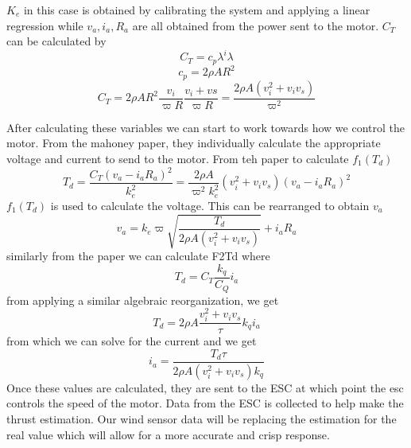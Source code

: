 \documentclass{article}
\begin{document}
$K_{e}$ in this case is obtained by calibrating the system and applying a linear regression while $v_{a}, i_{a}, R_{a}$ are all obtained from the power sent to the motor. $C_{T}$ can be calculated by 
\begin{equation}
C_{T} = c_{p} \lambda ^i \lambda 
\end{equation}
\begin{equation}
c_{p} = 2 \rho A R^2 \nonumber
\end{equation}
\begin{equation}
C_{T} = 2 \rho A R^2 \frac{v_{i}}{\varpi R}\frac{v_{i} + v{s}}{\varpi R}  = \frac{2 \rho A (v_{i}^2 + v_{i}v_{s})}{\varpi ^2}
\end{equation}

After calculating these variables we can start to work towards how we control the motor. From the mahoney paper, they individually calculate the appropriate voltage and current to send to the motor. From teh paper to calculate $f_{1}(T_{d})$
\begin{equation}
T_{d} = \frac{C_{T}(v_{a} - i_{a}R_{a})^2}{k_{e}^2}
 = \frac{2 \rho A}{\varpi ^2 k^2_{e}}(v^2_{i} + v_{i}v_{s})(v_{a} - i_{a}R_{a})^2
\end{equation}
$f_{1}(T_{d})$ is used to calculate the voltage. This can be rearranged to obtain $v_{a}$
\begin{equation}
v_{a} = k_{e} \varpi \sqrt{\frac{T_{d}}{2 \rho A (v_{i}^2 + v_{i}v_{s})}} + i_{a}R_{a}
\end{equation}
similarly from the paper we can calculate F2Td where 
\begin{equation}
T_{d} = C_{T} \frac{k_{q}}{C_{Q}}i_{a}
\end{equation}
from applying a similar algebraic reorganization, we get 
\begin{equation}
T_{d} = 2 \rho A \frac{v_{i}^2 + v_{i}v_{s}}{\tau} k_{q}i_a
\end{equation}
from which we can solve for the current and we get
\begin{equation}
i_a = \frac{T_d \tau}{2 \rho A (v_i^2 + v_i v_s) k_q}
\end{equation}
Once these values are calculated, they are sent to the ESC at which point the esc controls the speed of the motor. 
Data from the ESC is collected to help make the thrust estimation. 
Our wind sensor data will be replacing the estimation for the real value which will allow for a more accurate and crisp response.
\end{document}
